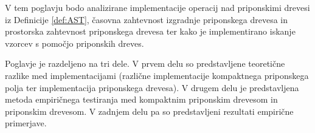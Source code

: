 V tem poglavju bodo analizirane implementacije operacij nad priponskimi drevesi iz Definicije \ref{def:AST}, časovna zahtevnost izgradnje priponskega drevesa in prostorska zahtevnost priponskega drevesa ter kako je implementirano iskanje vzorcev s pomočjo priponskih dreves.

Poglavje je razdeljeno na tri dele. V prvem delu so predstavljene teoretične razlike med implementacijami (različne implementacije kompaktnega priponskega polja ter implementacija priponskega drevesa). V drugem delu je predstavljena metoda empiričnega testiranja med kompaktnim priponskim drevesom in priponskim drevesom. V zadnjem delu pa so predstavljeni rezultati empirične primerjave.
